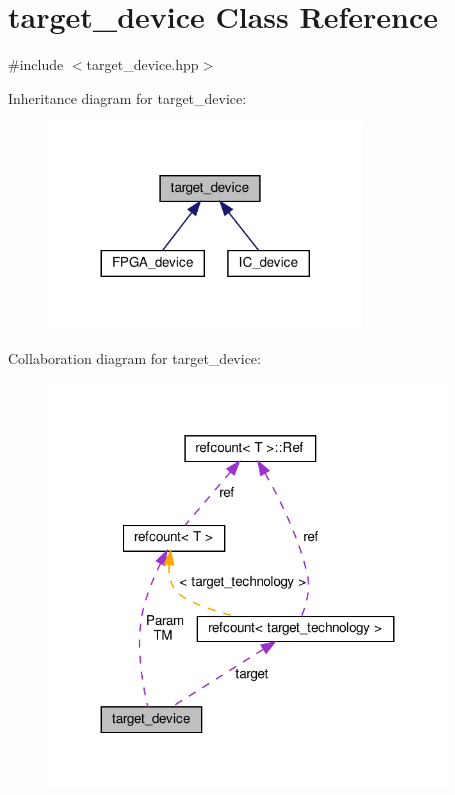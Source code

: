 \hypertarget{classtarget__device}{}\section{target\+\_\+device Class Reference}
\label{classtarget__device}


{\ttfamily \#include $<$target\+\_\+device.\+hpp$>$}



Inheritance diagram for target\+\_\+device\+:
\nopagebreak
\begin{figure}[H]
\begin{center}
\leavevmode
\includegraphics[width=236pt]{da/d17/classtarget__device__inherit__graph}
\end{center}
\end{figure}


Collaboration diagram for target\+\_\+device\+:
\nopagebreak
\begin{figure}[H]
\begin{center}
\leavevmode
\includegraphics[width=299pt]{da/d9f/classtarget__device__coll__graph}
\end{center}
\end{figure}
